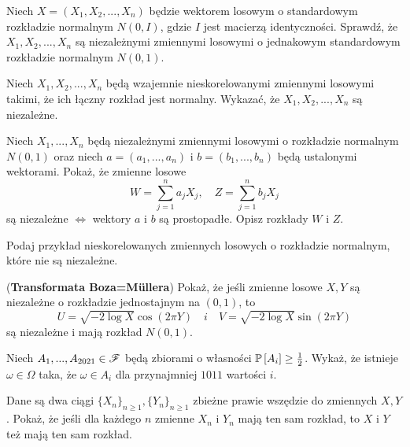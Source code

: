\documentclass{article}
\begin{document}
\begin{problem}{}
Niech $X=(X_1,X_2,...,X_n)$ będzie wektorem losowym o standardowym rozkładzie normalnym $N(0,I)$, gdzie $I$ jest macierzą identyczności. Sprawdź, że $X_1,X_2,...,X_n$ są niezależnymi zmiennymi losowymi o jednakowym standardowym rozkładzie normalnym $N(0,1)$.
\end{problem}

\begin{problem}{}
Niech $X_1,X_2,...,X_n$ będą wzajemnie nieskorelowanymi zmiennymi losowymi takimi, że ich łączny rozkład jest normalny. Wykazać, że $X_1,X_2,...,X_n$ są niezależne.
\end{problem}

\begin{problem}{}
Niech $X_1,...,X_n$ będą niezależnymi zmiennymi losowymi o rozkładzie normalnym $N(0,1)$ oraz niech $a=(a_1,...,a_n)$ i $b=(b_1,...,b_n)$ będą ustalonymi wektorami. Pokaż, że zmienne losowe
$$W=\sum_{j=1}^na_jX_j,\quad Z=\sum_{j=1}^n b_jX_j$$
są niezależne $\iff$ wektory $a$ i $b$ są prostopadłe. Opisz rozkłady $W$ i $Z$.
\end{problem}

\begin{problem}{}
Podaj przykład nieskorelowanych zmiennych losowych o rozkładzie normalnym, które nie są niezależne.
\end{problem}

\begin{problem}{}
(\textbf{Transformata Boza=M\"ullera}) Pokaż, że jeśli zmienne losowe $X,Y$ są niezależne o rozkładzie jednostajnym na $(0,1)$, to
$$U=\sqrt{-2\log X}\cos(2\pi Y) \quad i\quad V=\sqrt{-2\log X}\sin(2\pi Y)$$
są niezależne i mają rozkład $N(0,1)$.
\end{problem}

\begin{problem}{}
Niech $A_1,...,A_{2021}\in\mathcal{F}$ będą zbiorami o własności $\prob{A_i}\geq\frac{1}{2}$. Wykaż, że istnieje $\omega\in\Omega$ taka, że $\omega\in A_i$ dla przynajmniej $1011$ wartości $i$.
\end{problem}

\begin{problem}{}
Dane są dwa ciągi $\{X_n\}_{n\geq1},\{Y_n\}_{n\geq 1}$ zbieżne prawie wszędzie do zmiennych $X,Y$. Pokaż, że jeśli dla każdego $n$ zmienne $X_n$ i $Y_n$ mają ten sam rozkład, to $X$ i $Y$ też mają ten sam rozkład.
\end{problem}
\end{document}
